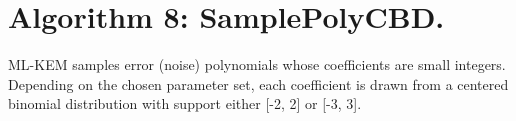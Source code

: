 \documentclass[12pt]{article}
\begin{document}
\begin{algorithm}[H]
\caption*{\textbf{Annotated Algorithm 7} $\Name{SampleNTT}(B:\mathbb{B}^{34}) \rightarrow (\widehat{a}:\RingTq$)}
\begin{algorithmic}[1]

\vspace*{2pt}

\State{$ \Ctx \is \XOFInit() $}







    \vspace*{1pt}
        \vspace*{1pt}
         \Comment{$\AH \in \RingTq$}
        \vspace*{1pt}
    \EndIf

        \vspace*{1pt}
         \Comment{$\AH \in \RingTq$}
        \vspace*{1pt}
    \EndIf

\EndWhile

\State{\Return \AH}

\end{algorithmic}
\end{algorithm}

\section{Algorithm 8: SamplePolyCBD.}
ML-KEM samples error (noise) polynomials whose coefficients are small integers. Depending on the chosen parameter set, each coefficient is drawn from a centered binomial distribution with support either [-2, 2] or [-3, 3].
\end{document}
